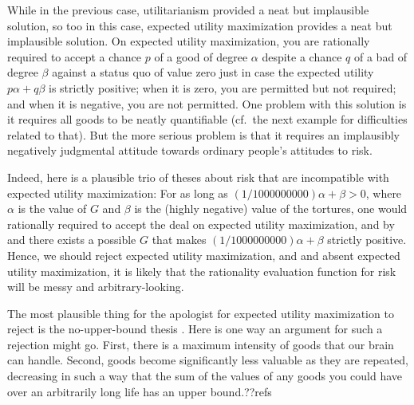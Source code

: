 While in the previous case, utilitarianism provided a neat but implausible solution, so too in this case, expected utility
maximization provides a neat but implausible solution. On expected utility maximization, you are rationally required to
accept a chance $p$ of a good of degree $\alpha$ despite a chance $q$ of a bad of degree $\beta$ against a status quo of
value zero just in case the
expected utility $p\alpha + q\beta$ is strictly positive; when it is zero, you are permitted but not required; 
and when it is negative, you are not permitted. One problem with this solution is it requires all goods to be neatly
quantifiable (cf.\ the next example for difficulties related to that). But the more serious problem is that it requires an
implausibly negatively judgmental attitude towards ordinary people's attitudes to risk.

Indeed, here is a plausible trio of theses about risk that are incompatible with expected utility maximization:
For as long as $(1/1000000000)\alpha + \beta>0$, where $\alpha$ is the value of $G$ and $\beta$ is the (highly negative)
value of the tortures, one would rationally required to accept the deal on expected utility maximization, and by 
and  there exists a possible $G$ that makes $(1/1000000000)\alpha + \beta$ strictly positive.
Hence, we should reject expected utility maximization, and and absent expected utility maximization, it is likely that the rationality evaluation function for risk will be messy
and arbitrary-looking.

The most plausible thing for the apologist for expected utility maximization to reject is the no-upper-bound thesis .
Here is one way an argument for such a rejection might go. First, there is a maximum intensity of goods that our brain can handle.
Second, goods become significantly less valuable as they are repeated, decreasing in such a way that the sum of the values of any 
goods you could have over an arbitrarily long life has an upper bound.??refs

